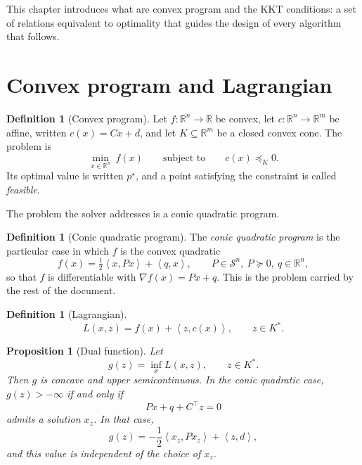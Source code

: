 \documentclass[a4paper,11pt]{book}
\theoremstyle{plain}
\newtheorem{proposition}[theorem]{Proposition}
\theoremstyle{definition}
\newtheorem{definition}[theorem]{Definition}
\theoremstyle{remark}
\numberwithin{equation}{chapter}
\numberwithin{algorithm}{chapter}
\newcommand{\R}{\mathbb{R}}
\newcommand{\Sp}{\mathcal{S}}
\newcommand{\inner}[2]{\left\langle #1, #2 \right\rangle}
\begin{document}
	This chapter introduces what are convex program and the KKT conditions: a set of relations equivalent to optimality
	that guides the design of every algorithm that follows.
	\section{Convex program and Lagrangian}
	\begin{definition}[Convex program]
		Let $f:\R^n\to\R$ be convex, let $c:\R^n\to\R^m$ be affine, written
		$c(x)=Cx+d$, and let $K\subseteq\R^m$ be a closed convex cone. The problem
		is
		\begin{equation}
			\min_{x\in\R^n}\ f(x)
			\qquad\text{subject to}\qquad
			c(x)\preceq_K0 .
		\end{equation}
		Its optimal value is written $p^\star$, and a point satisfying the constraint
		is called \emph{feasible}.
	\end{definition}
	
	The problem the solver addresses is a conic quadratic program.
	\begin{definition}[Conic quadratic program]
		The \emph{conic quadratic program} is the particular case in which $f$ is the
		convex quadratic
		\begin{equation}
			f(x)=\tfrac12\inner{x}{Px}+\inner{q}{x},
			\qquad P\in\Sp^n,\ P\succeq0,\ q\in\R^n ,
		\end{equation}
		so that $f$ is differentiable with $\nabla f(x)=Px+q$. This is the problem
		carried by the rest of the document.
	\end{definition}
	
	\begin{definition}[Lagrangian]
		\begin{equation}
			L(x,z)=f(x)+\inner{z}{c(x)},
			\qquad z\in K^* .
		\end{equation}
	\end{definition}
	
	\begin{proposition}[Dual function]
		Let
		\[
		g(z)=\inf_{x}L(x,z),
		\qquad z\in K^*.
		\]
		Then \(g\) is concave and upper semicontinuous. In the conic quadratic case,
		\(g(z)>-\infty\) if and only if
		\begin{equation}
			Px+q+C^\top z=0
			\label{eq:dual-stationarity}
		\end{equation}
		admits a solution \(x_z\). In that case,
		\begin{equation}
			g(z)
			=
			-\frac12\inner{x_z}{Px_z}
			+
			\inner{z}{d},
		\end{equation}
		and this value is independent of the choice of \(x_z\).
	\end{proposition}
	
\end{document}
